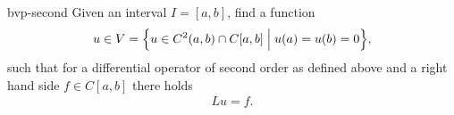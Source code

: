 \begin{Definition}{bvp-second}
  Given an interval $I=[a,b]$, find a function
  \begin{gather}
    \label{eq:bvp-second:3}
    u\in V = \Bigl\{u\in C^2(a,b) \cap C[a,b]
	\;\Big|\; u(a) = u(b) = 0 \Bigr\},
  \end{gather}
  such that for a differential operator of second order as defined
  above and a right hand side $f\in C[a,b]$ there holds
  \begin{gather}
    \label{eq:bvp-second:2}
    Lu = f.
  \end{gather}
\end{Definition}
